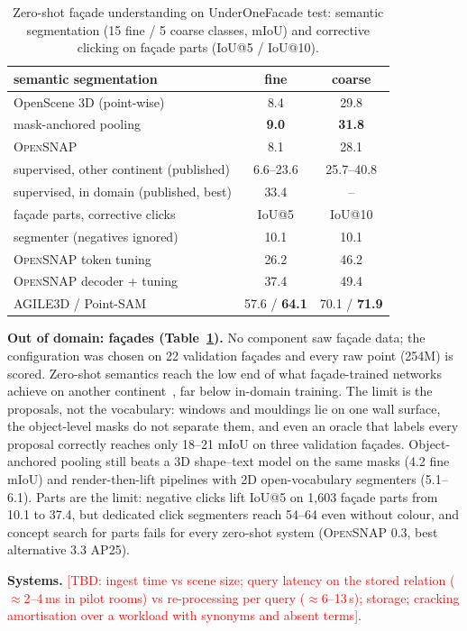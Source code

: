 \documentclass[conference]{IEEEtran}
\newcommand{\TBD}[1]{\textcolor{red}{[TBD: #1]}}
\newcommand{\sys}{\textsc{OpenSNAP}}
\begin{document}
\begin{table}[t]\centering\caption{Zero-shot fa\c{c}ade understanding on UnderOneFacade test: semantic
segmentation (15 fine / 5 coarse classes, mIoU) and corrective clicking on fa\c{c}ade parts (IoU@5 / IoU@10).}\label{tab:facade}
\begin{tabular}{lcc}\toprule
semantic segmentation & fine & coarse \\\midrule
OpenScene 3D (point-wise) & 8.4 & 29.8 \\
mask-anchored pooling & \textbf{9.0} & \textbf{31.8} \\
\sys{} & 8.1 & 28.1 \\
supervised, other continent (published) & 6.6--23.6 & 25.7--40.8 \\
supervised, in domain (published, best) & 33.4 & -- \\\midrule
fa\c{c}ade parts, corrective clicks & IoU@5 & IoU@10 \\\midrule
segmenter (negatives ignored) & 10.1 & 10.1 \\
\sys{} token tuning & 26.2 & 46.2 \\
\sys{} decoder + tuning & 37.4 & 49.4 \\
AGILE3D / Point-SAM~\cite{agile3d,pointsam} & 57.6 / \textbf{64.1} & 70.1 / \textbf{71.9} \\\bottomrule
\end{tabular}\end{table}

\textbf{Out of domain: fa\c{c}ades (Table~\ref{tab:facade}).} No component saw fa\c{c}ade data; the configuration was
chosen on 22 validation fa\c{c}ades and every raw point (254M) is scored. Zero-shot semantics reach the low end of what
fa\c{c}ade-trained networks achieve on another continent~\cite{underonefacade}, far below in-domain training. The
limit is the proposals, not the vocabulary: windows and mouldings lie on one wall surface, the object-level masks do
not separate them, and even an oracle that labels every proposal correctly reaches only 18--21 mIoU on three validation fa\c{c}ades.
Object-anchored pooling still beats a 3D shape--text model on the same masks (4.2 fine mIoU) and render-then-lift
pipelines with 2D open-vocabulary segmenters (5.1--6.1). Parts are the limit: negative clicks lift IoU@5 on 1{,}603
fa\c{c}ade parts from 10.1 to 37.4, but dedicated click segmenters reach 54--64 even without colour, and concept search
for parts fails for every zero-shot system (\sys{} 0.3, best alternative 3.3 AP25).

\textbf{Systems.} \TBD{ingest time vs scene size; query latency on the stored relation ($\approx$2--4\,ms in pilot rooms)
vs re-processing per query ($\approx$6--13\,s); storage; cracking amortisation over a workload with synonyms and absent
terms}.
\end{document}
